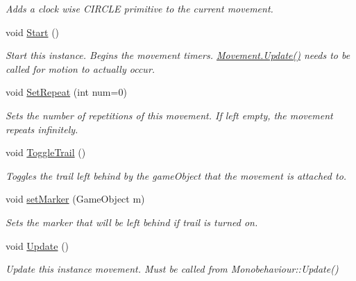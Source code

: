 \begin{DoxyCompactItemize}
\begin{DoxyCompactList}\small\item\em Adds a clock wise C\+I\+R\+C\+L\+E primitive to the current movement. \end{DoxyCompactList}\item 
void \hyperlink{class_movement_a5382914e6da64dbf89460062fdb4a08a}{Start} ()
\begin{DoxyCompactList}\small\item\em Start this instance. Begins the movement timers. \hyperlink{class_movement_ad9278ecc9daea58c9bc3737cc388e58f}{Movement.\+Update()} needs to be called for motion to actually occur. \end{DoxyCompactList}\item 
void \hyperlink{class_movement_a9393878b87b8b2a57d1c31be0ba3d7d2}{Set\+Repeat} (int num=0)
\begin{DoxyCompactList}\small\item\em Sets the number of repetitions of this movement. If left empty, the movement repeats infinitely. \end{DoxyCompactList}\item 
void \hyperlink{class_movement_a414ac18e7c7c0085c9f50be3f00fd937}{Toggle\+Trail} ()
\begin{DoxyCompactList}\small\item\em Toggles the trail left behind by the game\+Object that the movement is attached to. \end{DoxyCompactList}\item 
void \hyperlink{class_movement_a730a891708abea9596743974e594fa26}{set\+Marker} (Game\+Object m)
\begin{DoxyCompactList}\small\item\em Sets the marker that will be left behind if trail is turned on. \end{DoxyCompactList}\item 
void \hyperlink{class_movement_ad9278ecc9daea58c9bc3737cc388e58f}{Update} ()
\begin{DoxyCompactList}\small\item\em Update this instance movement. Must be called from Monobehaviour\+::\+Update() \end{DoxyCompactList}\end{DoxyCompactItemize}
